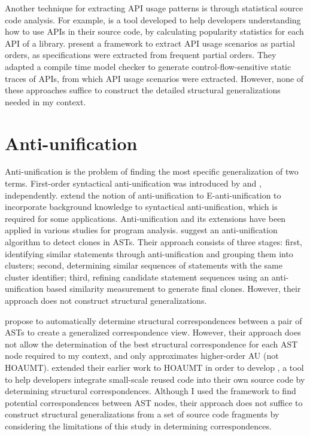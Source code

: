 Another technique for extracting API usage patterns is through statistical source code analysis. For example,  \cite{holmes2007informing} is a tool developed to help developers understanding how to use APIs in their source code, by calculating popularity statistics for each API of a library. \citet{acharya2007mining} present a framework to extract API usage scenarios as partial orders, as specifications were extracted from frequent partial orders. They adapted a compile time model checker to generate control-flow-sensitive static traces of APIs, from which API usage scenarios were extracted. However, none of these approaches suffice to construct the detailed structural generalizations needed in my context.

\section{Anti-unification}  \label{ch7-au}
Anti-unification is the problem of finding the most specific generalization of two terms. First-order syntactical anti-unification was introduced by \citet{plotkin1970note} and \citet{reynolds1970transformational}, independently. \citet{burghardt1996implementing} extend the notion of anti-unification to E-anti-unification to incorporate background knowledge to syntactical anti-unification, which is required for some applications. Anti-unification and its extensions have been applied in various studies for program analysis. \citet{2009:iwsc:bulychev} suggest an anti-unification algorithm to detect clones in ASTs. Their approach consists of three stages: first, identifying similar statements through anti-unification and grouping them into clusters; second, determining similar sequences of statements with the same cluster identifier; third, refining candidate statement sequences using an anti-unification based similarity measurement to generate final clones. However, their approach does not construct structural generalizations.

\citet{2007:esec_fse:cottrell} propose  to automatically determine structural correspondences between a pair of ASTs to create a generalized correspondence view. However, their approach does not allow the determination of the best structural correspondence for each AST node required to my context, and only approximates higher-order AU (not HOAUMT). \citet{2008:fse:cottrell} extended their earlier work to HOAUMT in order to develop , a tool to help developers integrate small-scale reused code into their own source code by determining structural correspondences. Although I used the  framework to find potential correspondences between AST nodes, their approach does not suffice to construct structural generalizations from a set of source code fragments by considering the limitations of this study in determining correspondences.

